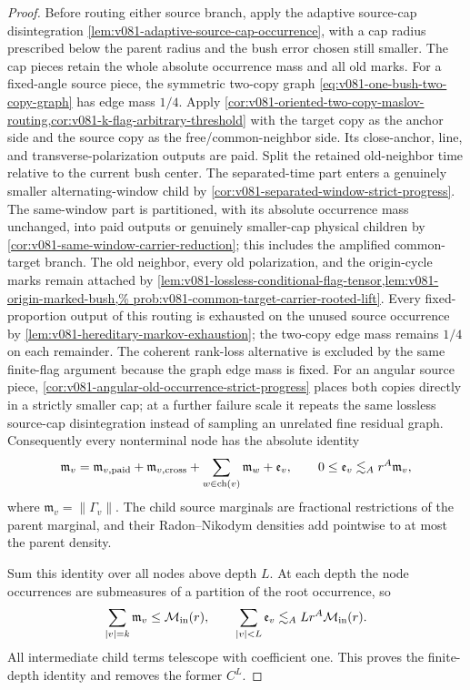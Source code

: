 \documentclass[10pt]{article}
\begin{document}
\begin{proof}
Before routing either source branch, apply the adaptive source-cap disintegration
\cref{lem:v081-adaptive-source-cap-occurrence}, with a cap radius prescribed below the parent
radius and the bush error chosen still smaller.  The cap pieces retain the whole absolute
occurrence mass and all old marks.  For a fixed-angle source piece, the symmetric two-copy graph
\eqref{eq:v081-one-bush-two-copy-graph} has edge mass \(1/4\).  Apply
\cref{cor:v081-oriented-two-copy-maslov-routing,cor:v081-k-flag-arbitrary-threshold} with the target
copy as the anchor side and the source copy as the free/common-neighbor side.  Its close-anchor,
line, and transverse-polarization outputs are paid.  Split the retained old-neighbor time relative
to the current bush center.  The separated-time part enters a genuinely smaller alternating-window
child by \cref{cor:v081-separated-window-strict-progress}.  The same-window part is partitioned,
with its absolute occurrence mass unchanged, into paid outputs or genuinely smaller-cap physical
children by \cref{cor:v081-same-window-carrier-reduction}; this includes the amplified
common-target branch.  The old neighbor, every old polarization, and the origin-cycle marks remain
attached by
\cref{lem:v081-lossless-conditional-flag-tensor,lem:v081-origin-marked-bush,%
prob:v081-common-target-carrier-rooted-lift}.  Every fixed-proportion output of this routing is
exhausted on the unused source occurrence by
\cref{lem:v081-hereditary-markov-exhaustion}; the two-copy edge mass remains \(1/4\) on each
remainder.  The coherent rank-loss alternative is excluded by the same finite-flag argument
because the graph edge mass is fixed.  For an angular source
piece, \cref{cor:v081-angular-old-occurrence-strict-progress} places both copies directly in a
strictly smaller cap; at a further failure scale it repeats the same lossless source-cap
disintegration instead of sampling an unrelated fine residual graph.  Consequently every
nonterminal node has the absolute identity
\[
\mathfrak m_v
=
\mathfrak m_{v,{\rm paid}}
+
\mathfrak m_{v,{\rm cross}}
+
\sum_{w\in{\rm ch}(v)}\mathfrak m_w
+\mathfrak e_v,
\qquad
0\le\mathfrak e_v\lesssim_A r^A\mathfrak m_v,
\]
where \(\mathfrak m_v=\|\Gamma_v\|\).  The child source marginals are fractional restrictions of
the parent marginal, and their Radon--Nikodym densities add pointwise to at most the parent density.

Sum this identity over all nodes above depth \(L\).  At each depth the node occurrences are
submeasures of a partition of the root occurrence, so
\[
\sum_{|v|=k}\mathfrak m_v\le\mathcal M_{\rm in}(r),
\qquad
\sum_{|v|<L}\mathfrak e_v
\lesssim_A Lr^A\mathcal M_{\rm in}(r).
\]
All intermediate child terms telescope with coefficient one.  This proves the finite-depth
identity and removes the former \(C^L\).


\end{proof}
\end{document}
